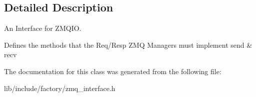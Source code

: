 \subsection{Detailed Description}
An Interface for Z\-M\-Q\-I\-O. 

Defines the methods that the Req/\-Resp Z\-M\-Q Managers must implement send \& recv 

The documentation for this class was generated from the following file\-:\begin{DoxyCompactItemize}
\item 
lib/include/factory/zmq\-\_\-interface.\-h\end{DoxyCompactItemize}
